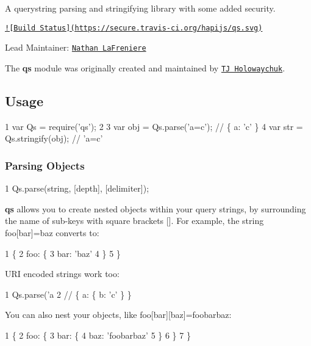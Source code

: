 A querystring parsing and stringifying library with some added security.

\href{http://travis-ci.org/hapijs/qs}{\tt !\mbox{[}Build Status\mbox{]}(https\+://secure.\+travis-\/ci.\+org/hapijs/qs.\+svg)}

Lead Maintainer\+: \href{https://github.com/nlf}{\tt Nathan La\+Freniere}

The {\bfseries qs} module was originally created and maintained by \href{https://github.com/visionmedia/node-querystring}{\tt T\+J Holowaychuk}.

\subsection*{Usage}


\begin{DoxyCode}
1 var Qs = require('qs');
2 
3 var obj = Qs.parse('a=c');    // \{ a: 'c' \}
4 var str = Qs.stringify(obj);  // 'a=c'
\end{DoxyCode}


\subsubsection*{Parsing Objects}


\begin{DoxyCode}
1 Qs.parse(string, [depth], [delimiter]);
\end{DoxyCode}


{\bfseries qs} allows you to create nested objects within your query strings, by surrounding the name of sub-\/keys with square brackets {\ttfamily \mbox{[}\mbox{]}}. For example, the string {\ttfamily \textquotesingle{}foo\mbox{[}bar\mbox{]}=baz\textquotesingle{}} converts to\+:


\begin{DoxyCode}
1 \{
2   foo: \{
3     bar: 'baz'
4   \}
5 \}
\end{DoxyCode}


U\+R\+I encoded strings work too\+:


\begin{DoxyCode}
1 Qs.parse('a%
2 // \{ a: \{ b: 'c' \} \}
\end{DoxyCode}


You can also nest your objects, like {\ttfamily \textquotesingle{}foo\mbox{[}bar\mbox{]}\mbox{[}baz\mbox{]}=foobarbaz\textquotesingle{}}\+:


\begin{DoxyCode}
1 \{
2   foo: \{
3     bar: \{
4       baz: 'foobarbaz'
5     \}
6   \}
7 \}
\end{DoxyCode}


